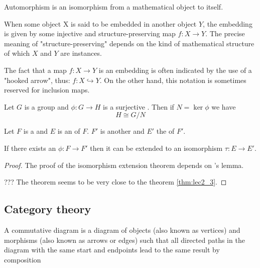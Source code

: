\begin{appendices}
\begin{definition}[Automorphism]
  Automorphism is an isomorphism from a mathematical object to itself.
  \label{def:automorphism}
\end{definition}

\begin{definition}[Embedding]
  When some object X is said to be embedded in another object $Y$, the
  embedding is given by some injective and structure-preserving map
  $f : X \to Y$. The precise meaning of "structure-preserving" depends on
  the kind of mathematical structure of which $X$ and $Y$ are
  instances.
  
  The fact that a map $f : X \to Y$ is an embedding is often indicated
  by the use of a "hooked arrow", thus: $f:X\hookrightarrow Y$. On the
  other hand, this notation is sometimes reserved for inclusion maps.
  \label{def:embedding}
\end{definition}

\begin{theorem}
  Let $G$ is a group and $\phi: G \to H$ is a
  surjective . Then if $N = \ker \phi$ we
  have
  \[
  H \cong G/N
  \]
  \label{thm:firstisomorphism}
\end{theorem}

\begin{theorem}
  Let $F$ is a  and $E$ is an
   of $F$.
  $F'$ is another  and $E'$ the 
   of $F'$.

  If there exists an  $\phi: F \to F'$ then
  it can be extended to an isomorphism $\tau: E \to E'$.

  \begin{proof}
    The proof of the isomorphism extension theorem depends on
    's lemma.

    ??? The theorem seems to be very close to the theorem
    \ref{thm:lec2_3}. 
  \end{proof}
  
  \label{thm:isomorphismextension}
\end{theorem}

\subsection{Category theory}

\begin{definition}
  A commutative diagram is a diagram of objects (also known as
  vertices) and morphisms (also known as arrows or edges) such that
  all directed paths in the diagram with the same start and endpoints
  lead to the same result by composition
  \label{def:commutativediagram}


\end{definition}
\end{appendices}
